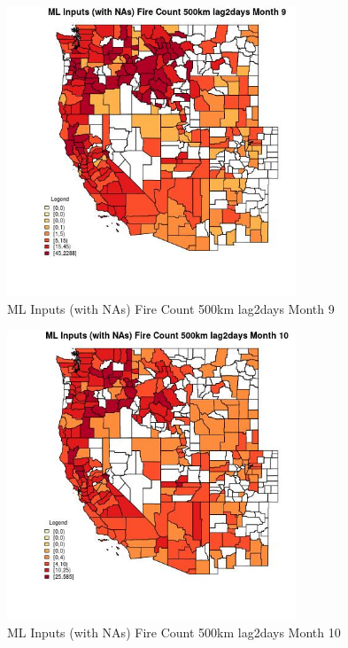\clearpage 

\begin{figure} 
\centering  
\includegraphics[width=0.77\textwidth]{Code_Outputs/Report_ML_input_PM25_Step4_part_e_de_duplicated_aves_compiled_2019-05-21wNAs_CountyFire_Count_500km_lag2daysmedianMonth9.jpg} 
\caption{\label{fig:Report_ML_input_PM25_Step4_part_e_de_duplicated_aves_compiled_2019-05-21wNAsCountyFire_Count_500km_lag2daysmedianMonth9}ML Inputs (with NAs) Fire Count 500km lag2days Month 9} 
\end{figure} 
 

\begin{figure} 
\centering  
\includegraphics[width=0.77\textwidth]{Code_Outputs/Report_ML_input_PM25_Step4_part_e_de_duplicated_aves_compiled_2019-05-21wNAs_CountyFire_Count_500km_lag2daysmedianMonth10.jpg} 
\caption{\label{fig:Report_ML_input_PM25_Step4_part_e_de_duplicated_aves_compiled_2019-05-21wNAsCountyFire_Count_500km_lag2daysmedianMonth10}ML Inputs (with NAs) Fire Count 500km lag2days Month 10} 
\end{figure} 
 

